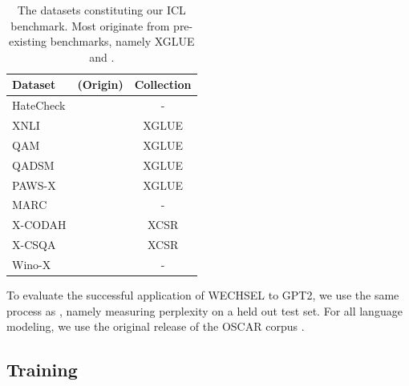 \documentclass[11pt]{article}
\begin{document}
\begingroup
\setlength{\tabcolsep}{0.5pt}
\begin{table}[t]
	\centering
	\caption{The datasets constituting our ICL benchmark. Most originate from pre-existing benchmarks,
		namely XGLUE \citep{liang_xglue_2020} and \citep{lin_common_2021}.}
	\label{tab:benchmark}
	\begin{tabular}{@{}llc@{}}
		\toprule
		\multicolumn{1}{l}{Dataset} & \multicolumn{1}{l}{(Origin)}    & Collection \\ \midrule
		HateCheck                   & \citep{rottger_hatecheck_2021}  & -          \\
		XNLI                        & \citep{conneau_xnli_2018}       & XGLUE      \\
		QAM                         & \citep{liang_xglue_2020}        & XGLUE      \\
		QADSM                       & \citep{liang_xglue_2020}        & XGLUE      \\
		PAWS-X                      & \citep{yang_paws-x_2019}        & XGLUE      \\
		MARC                        & \citep{keung_multilingual_2020} & -          \\
		X-CODAH                     & \citep{lin_common_2021}         & XCSR       \\
		X-CSQA                      & \citep{lin_common_2021}         & XCSR       \\
		Wino-X                      & \citep{emelin_wino-x_2021}      & -          \\ \bottomrule
	\end{tabular}
\end{table}
\endgroup

To evaluate the successful application of WECHSEL to GPT2, we use the same process as
\citet{minixhofer_wechsel_2022}, namely measuring perplexity on a held out test set. For all
language modeling, we use the original release of the OSCAR corpus
\citep{ortiz_suarez_monolingual_2020}.

\subsection{Training}
\end{document}
